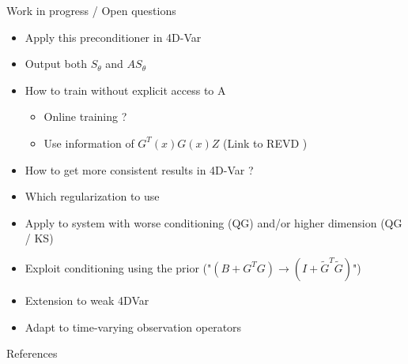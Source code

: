 \documentclass[10pt,aspectratio=169]{beamer}
\begin{document}

\begin{frame}{Work in progress / Open questions}
    \begin{itemize}
        \item Apply this preconditioner in 4D-Var \checkmark
        \item Output both $S_{\theta}$ and $AS_{\theta}$ \checkmark
        \item How to train without explicit access to A \faGears
        \begin{itemize}
            \item Online training ?
            \item Use information of $G^T(x)G(x)Z$ (Link to REVD \cite{dauzickaite_randomised_2021})
        \end{itemize}
        \end{itemize}
    \begin{itemize}
        \item How to get more consistent results in 4D-Var ? \faGears
        \item Which regularization to use \faGears
        \item Apply to system with worse conditioning (QG) and/or higher dimension (QG / KS) \faGears
    \end{itemize}    
        \begin{itemize}
        \item Exploit conditioning using the prior ("$(B + G^TG) \rightarrow (I + \tilde{G}^T\tilde{G})$") \faQuestionCircle
        \item Extension to weak 4DVar  \faQuestionCircle
        \item Adapt to time-varying observation operators  \faQuestionCircle
        \end{itemize}
\end{frame}




\begin{frame}[allowframebreaks]{References}
  
  
\end{frame}
\end{document}
